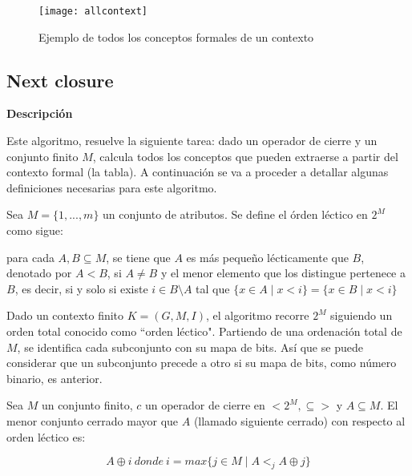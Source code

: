         \begin{figure}[H]
            \centering
            \texttt{[image: allcontext]}
            \caption{Ejemplo de todos los conceptos formales de un contexto}
            \label{fig:allcontext}
        \end{figure}

        \clearpage



\subsection{Next closure}

        \textbf{Descripci\'on}

        Este algoritmo, resuelve la siguiente tarea: dado un operador de cierre y un conjunto finito \(M\), calcula todos los 
        conceptos que pueden extraerse a partir del contexto formal (la tabla). A continuaci\'on se va a proceder a detallar 
        algunas definiciones necesarias para este algoritmo.

        \bigskip

        Sea \(M=\{1, ..., m\}\) un conjunto de atributos. Se define el \'orden l\'ectico en \(2^M\) como sigue: 
        
        para cada \(A,B \subseteq M\), se tiene que \(A\) 
        es m\'as peque\~no l\'ecticamente que \(B\), denotado por \(A < B\), si \(A \neq B\) y el menor elemento que los distingue 
        pertenece a \(B\), es decir, si y solo si existe \(i \in B \setminus A \) tal que \( \{x \in A \mid x < i\} = \{x \in B 
        \mid x < i\} \)

        \bigskip

        Dado un contexto finito \( K=(G, M, I) \), el algoritmo recorre \(2^M\) siguiendo un orden total conocido como ``orden l\'ectico". 
        Partiendo de una ordenaci\'on total de \(M\), se identifica cada subconjunto con su mapa de bits. As\'i que se puede considerar 
        que un subconjunto precede a otro si su mapa de bits, como n\'umero binario, es anterior.
    
        \bigskip

        Sea \(M\) un conjunto finito, \(c\) un operador de cierre en \(<2^M, \subseteq > \) y \(A \subseteq M \). El menor 
        conjunto cerrado mayor que \(A\) (llamado siguiente cerrado) con respecto al orden l\'ectico es:

        \[
            A \oplus i ~ donde ~ i = max \{j \in M \mid A <_{j} A \oplus j \}
        \]

